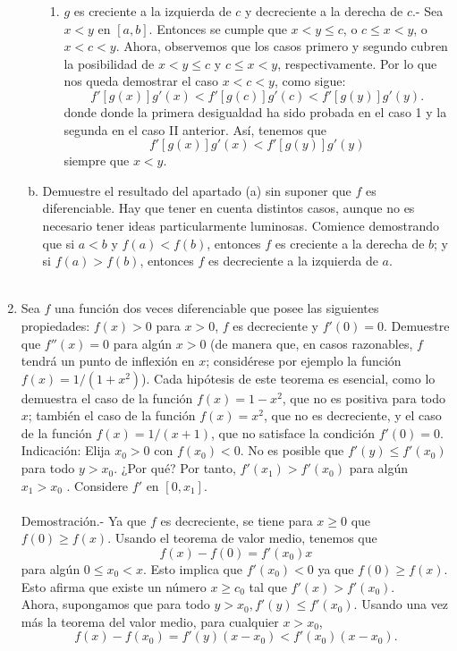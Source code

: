 \begin{enumerate}[\bfseries 1.]
\begin{enumerate}[(a)]
\begin{enumerate}
		    \item $g$ es creciente a la izquierda de $c$ y decreciente a la derecha de $c$.- Sea $x<y$ en $[a,b]$. Entonces se cumple que $x<y\leq c$, o $c\leq x<y$, o $x<c<y$. Ahora, observemos que los casos primero y segundo cubren la posibilidad de $x<y\leq c$ y $c\leq x<y$, respectivamente. Por lo que nos queda demostrar el caso $x<c<y$, como sigue:
		    $$f'\left[g(x)\right]g'(x)<f'\left[g(c)\right]g'(c)<f'\left[g(y)\right]g'(y).$$
		    donde donde la primera desigualdad ha sido probada en el caso 1 y la segunda en el caso II anterior. Así, tenemos que
		    $$f'\left[g(x)\right]g'(x)<f'\left[g(y)\right]g'(y)$$
		    siempre que $x<y$. 
		\end{enumerate}
		\vspace{.5cm}

	    \item Demuestre el resultado del apartado (a) sin suponer que $f$ es diferenciable. Hay que tener en cuenta distintos casos, aunque no es necesario tener ideas particularmente luminosas. Comience demostrando que si $a<b$ y $f(a)<f(b)$, entonces $f$ es creciente a la derecha de $b$; y si $f(a)>f(b)$, entonces $f$ es decreciente a la izquierda de $a$.\\\\

	\end{enumerate}

    \item Sea $f$ una función dos veces diferenciable que posee las siguientes propiedades: $f(x)>0$ para $x>0$, $f$ es decreciente y $f'(0) = 0$. Demuestre que $f''(x)=0$ para algún $x>0$ (de manera que, en  casos razonables, $f$ tendrá un punto de inflexión en $x$; considérese por ejemplo la función $f(x)=1/(1+x^2)$). Cada hipótesis de este teorema es esencial, como lo demuestra el caso de la función $f(x)=1-x^2$, que no es positiva para todo $x$; también el caso de la función $f(x)=x^2$, que no es decreciente, y el caso de la función $f(x)=1/(x+1)$, que no satisface la condición $f'(0)=0$. Indicación: Elija $x_0>0$ con $f(x_0)<0$. No es posible que $f'(y)\leq f'(x_0)$ para todo $y>x_0$. ¿Por qué? Por tanto, $f'(x_1)>f'(x_0)$ para algún $x_1>x_0$ . Considere $f'$ en $[0, x_1]$.\\\\
	Demostración.-\; Ya que $f$ es decreciente, se tiene para $x\geq 0$ que $f(0)\geq f(x)$. Usando el teorema de valor medio, tenemos que 
	$$f(x)-f(0)=f'(x_0)x$$
	para algún $0\leq x_0<x$. Esto implica que $f'(x_0)<0$ ya que $f(0)\geq f(x)$. Esto afirma que existe un número $x\geq c_0$ tal que $f'(x)>f'(x_0)$.\\
	Ahora, supongamos que para todo $y>x_0, f'(y)\leq f'(x_0)$. Usando una vez más la teorema del valor medio, para cualquier $x>x_0$,
	$$f(x)-f(x_0)=f'(y)(x-x_0)<f'(x_0)(x-x_0).$$


\end{enumerate}
